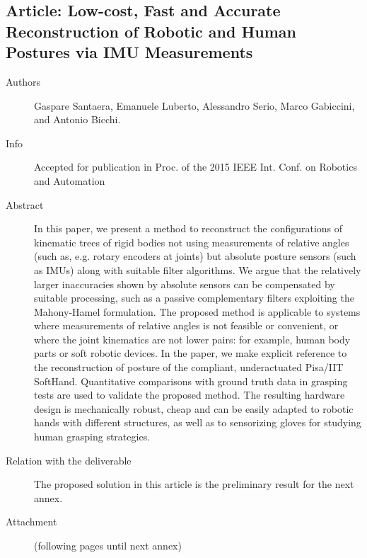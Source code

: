 \documentclass[a4paper,11pt,pdf]{pacmanreport}
\begin{document}
\subsection{Article: Low-cost, Fast and Accurate Reconstruction of Robotic and Human Postures via IMU Measurements} \label{sec:imu2Fingers}
\begin{description}
	\item[Authors] Gaspare Santaera, Emanuele Luberto, Alessandro Serio, Marco Gabiccini, and Antonio Bicchi.
	\item[Info] Accepted for publication in Proc. of the 2015 IEEE Int. Conf. on Robotics and Automation
	\item[Abstract] In this paper, we present a method to reconstruct the configurations of kinematic trees of rigid bodies not using
measurements of relative angles (such as, e.g. rotary encoders at joints) but absolute posture sensors (such as IMUs) along with suitable filter algorithms. We argue that the relatively larger inaccuracies shown by absolute sensors can be compensated by suitable processing, such as a passive complementary filters exploiting the Mahony-Hamel formulation. The proposed method is applicable to  systems where measurements of relative angles is not feasible or convenient, or where the joint kinematics are not lower pairs: for example, human body parts or soft robotic devices. In the paper, we make explicit reference to the reconstruction of posture of the compliant, underactuated Pisa/IIT SoftHand. Quantitative comparisons with ground truth data in grasping tests are used to validate the proposed method. The resulting hardware design is mechanically robust, cheap and can be easily adapted to robotic hands with different structures, as well as to sensorizing gloves for studying human grasping strategies.
	\item[Relation with the deliverable] The proposed solution in this article is the preliminary result for the next annex.
	\item[Attachment] (following pages until next annex)
\end{description}

\end{document}
